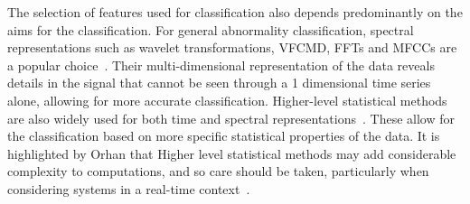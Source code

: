 \documentclass[titlepage]{scrartcl}
\begin{document}
\begin{itemize}
        The selection of features used for classification also depends
        predominantly on the aims for the classification. For general
        abnormality classification, spectral representations such as wavelet
        transformations, VFCMD, FFTs and MFCCs are a popular
        choice~\parencite{Bung2000, Wu1995, Yaghouby2009, Dash2009}. Their
        multi-dimensional representation of the data reveals details in the
        signal that cannot be seen through a 1 dimensional time series alone,
        allowing for more accurate classification. Higher-level statistical
        methods are also widely used for both time and spectral
        representations~\parencite{Bung2000, Quiceno-Manrique2010a,
        Schmidt2015, Dash2009, Yaghouby2009}. These allow for the
        classification based on more specific statistical properties of the
        data. It is highlighted by Orhan that Higher level statistical methods
        may add considerable complexity to computations, and so care should be
        taken, particularly when considering systems in a real-time
        context~\citeyearpar{Orhan2013}.
        
\end{itemize}

\pagebreak{}
\printbibliography{}
\end{document}
